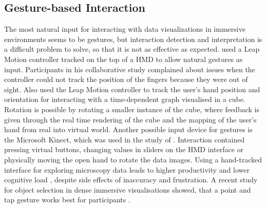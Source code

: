 \subsection{Gesture-based Interaction}
\label{subsection:Gesture-based Interaction}
The most natural input for interacting with data visualizations in immersive environments seems to be gestures, but interaction detection and interpretation is a difficult problem to solve, so that it is not as effective as expected.\newline
\cite{Cordeil2017b} used a Leap Motion controller tracked on the top of a \ac{HMD} to allow natural gestures as input. Participants in his collaborative study complained about issues when the controller could not track the position of the fingers because they were out of sight.\newline
Also \cite{Clarke2016} used the Leap Motion controller to track the user's hand position and orientation for interacting with a time-dependent graph visualised in a cube. Rotation is possible by rotating a smaller instance of the cube, where feedback is given through the real time rendering of the cube and the mapping of the user's hand from real into virtual world.\newline
Another possible input device for gestures is the Microsoft Kinect, which was used in the study of \cite{Nagao2017}. Interaction contained pressing virtual buttons, changing values in sliders on the \ac{HMD} interface or physically moving the open hand to rotate the data images.\newline
Using a hand-tracked interface for exploring microscopy data leads to higher productivity \autocite[]{Theart2017} and lower cognitive load \autocite[]{Filho2020}, despite side effects of inaccuracy and frustration. 
A recent study for object selection in dense immersive visualisations showed, that a point and tap gesture works best for participants \autocite[]{Bhowmick2021}. \newline


